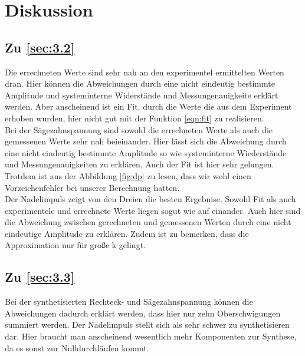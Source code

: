 \section{Diskussion}
\label{sec:Diskussion}

\subsection{Zu \ref{sec:3.2}}
Die errechneten Werte sind sehr nah an den experimentel ermittelten Werten dran.
Hier können die Abweichungen durch eine nicht eindeutig bestimmte Amplitude und
systeminterne Widerstände und Messungenauigkeite erklärt werden. Aber anscheinend ist ein Fit, durch die
Werte die aus dem Experiment erhoben wurden, hier nicht gut mit der Funktion \ref{eqn:fit}
 zu realisieren. \\
 Bei der Sägezahnspannung sind sowohl die errechneten Werte als auch die gemessenen
 Werte sehr nah beieinander. Hier lässt sich die Abweichung durch eine nicht eindeutig
 bestimmte Amplitude so wie systeminterne Wiederstände und
 Messungenauigkeiten zu erklären. Auch der Fit ist hier sehr gelungen. Trotdem
 ist aus der Abbildung \ref{fig:dp} zu lesen, dass wir wohl einen Vorzeichenfehler
  bei unserer Berechnung hatten. \\
 Der Nadelimpuls zeigt von den Dreien die besten Ergebnise. Sowohl Fit als auch
  experimentele und errechnete Werte liegen sogut wie auf einander. Auch hier sind die
  Abweichung zwischen gerechneten und gemessenen Werten durch eine nicht
  eindeutige Amplitude zu erklären. Zudem ist zu bemerken, dass die
  Approximation nur für große k gelingt.

\subsection{Zu \ref{sec:3.3}}
Bei der synthetisierten Rechteck- und Sägezahnspannung können die Abweichungen
dadurch erklärt werden, dass hier nur zehn Oberschwigungen summiert werden.
Der Nadelimpuls stellt sich als sehr schwer zu synthetisieren dar. Hier braucht
man anscheinend wesentlich mehr Komponenten zur Synthese, da es sonst zur Nulldurchläufen
kommt.
